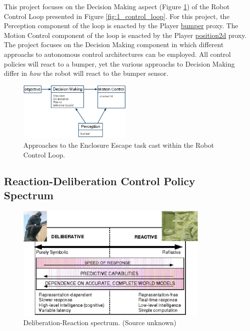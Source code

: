 \noindent This project focuses on the Decision Making aspect (Figure \ref{fig:5_decision_making}) of the Robot Control Loop presented in Figure \ref{fig:1_control_loop}. For this project, the Perception component of the loop is enacted by the Player \href{http://playerstage.sourceforge.net/doc/Player-2.1.0/player/group\_\_playerc\_\_proxy\_\_bumper.html}{bumper} proxy. The Motion Control component of the loop is enacted by the Player \href{http://playerstage.sourceforge.net/doc/Player-2.1.0/player/group\_\_playerc\_\_proxy\_\_position2d.html}{position2d} proxy. The project focuses on the Decision Making component in which different approachs to autonomous control architectures can be employed. All control policies will react to a bumper, yet the various approachs to Decision Making differ in \emph{how} the robot will react to the bumper sensor.

\begin{figure}[!h]
\centering
\includegraphics[width=0.5\textwidth]{figures/5_decision_making.png}
\caption{Approaches to the Enclosure Escape task cast within the Robot Control Loop.}
\label{fig:5_decision_making}
\end{figure}

\subsection{Reaction-Deliberation Control Policy Spectrum}

\begin{figure}[!h]
\centering
\includegraphics[width=0.85\textwidth]{figures/5_spectrum1.jpg}
\caption{Deliberation-Reaction spectrum. (Source unknown)}
\label{fig:5_spectrum}
\end{figure}

